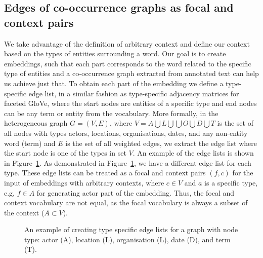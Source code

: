 \subsection{Edges of co-occurrence graphs as focal and context pairs}\label{sec:edges_as_pairs}
We take advantage of the definition of arbitrary context and define our context based on the types of entities surrounding a word. Our goal is to create embeddings, such that each part corresponds to the word related to the specific type of entities and a co-occurrence graph extracted from annotated text can help us achieve just that. To obtain each part of the embedding we define a type-specific edge list, in a similar fashion as type-specific adjacency matrices for faceted GloVe, where the start nodes are entities of a specific type and end nodes can be any term or entity from the vocabulary. More formally, in the heterogeneous graph $G=(V,E)$, where $V=A\bigcup  L\bigcup  \bigcup  O\bigcup  D\bigcup T $ is the set of all nodes with types actors, locations, organisations, dates, and any non-entity word (term) and $E$ is the set of all weighted edges, we extract the edge list where the start node is one of the types in set $V$. An example of the edge lists is shown in Figure~\ref{fig:facettedword2vec}. As demonstrated in Figure~\ref{fig:facettedword2vec}, we have a different edge list for each type. These edge lists can be treated as a focal and context pairs $(f,c)$ for the input of embeddings with arbitrary contexts, where $c \in V$ and $a$ is a specific type, e.g, $f \in A$ for generating actor part of the embedding. Thus, the focal and context vocabulary are not equal, as the focal vocabulary is always a subset of the context ($A \subset  V$). 
\begin{figure}
\centering 
\resizebox{0.80\textwidth}{0.28\textwidth}{      

}
\caption{An example of creating type specific edge lists for a graph with node type: actor (A), location (L), organisation (L), date (D), and term (T).}
\label{fig:facettedword2vec}
\end{figure} 
